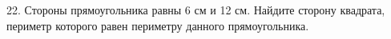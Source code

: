 22. Стороны прямоугольника равны 6 см и 12 см. Найдите сторону квадрата, периметр которого равен периметру данного прямоугольника.\\

